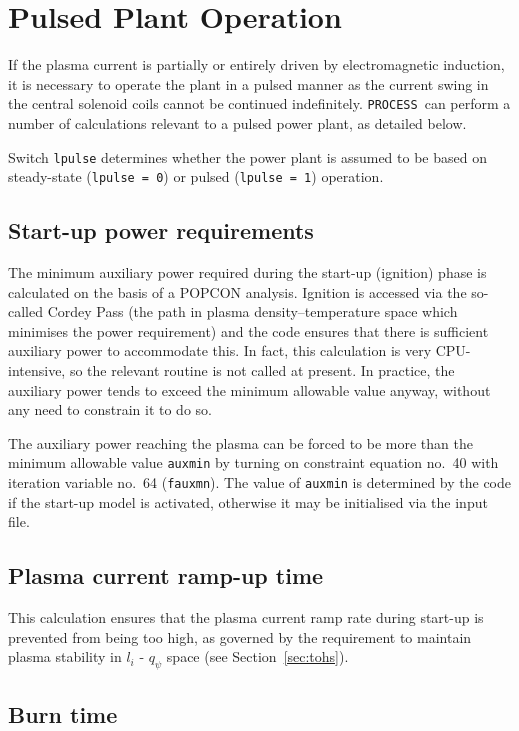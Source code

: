 \documentclass[11pt,a4paper]{report}
\newcommand{\process}{\mbox{\texttt{PROCESS}}}
\begin{document}
\section{Pulsed Plant Operation}
\label{sec:pulsed}

If the plasma current is partially or entirely driven by electromagnetic induction, it is
necessary to operate the plant in a pulsed manner as the current swing in the
central solenoid coils cannot be continued indefinitely. \process\ can perform a number of
calculations relevant to a pulsed power plant, as detailed below.

Switch \texttt{lpulse} determines whether the power plant is assumed to be
based on steady-state (\texttt{lpulse = 0}) or pulsed (\texttt{lpulse = 1})
operation.

\subsection{Start-up power requirements}

The minimum auxiliary power required during the start-up (ignition) phase is
calculated on the basis of a POPCON analysis. Ignition is accessed via the
so-called Cordey Pass (the path in plasma density--temperature space which
minimises the power requirement) and the code ensures that there is sufficient
auxiliary power to accommodate this. In fact, this calculation is very
CPU-intensive, so the relevant routine is not called at present. In practice,
the auxiliary power tends to exceed the minimum allowable value anyway,
without any need to constrain it to do so.

The auxiliary power reaching the plasma can be forced to be more than the
minimum allowable value \texttt{auxmin} by turning on constraint equation no.\
40 with iteration variable no.\ 64 (\texttt{fauxmn}). The value of
\texttt{auxmin} is determined by the code if the start-up model is activated,
otherwise it may be initialised via the input file.

\subsection{Plasma current ramp-up time}

This calculation ensures that the plasma current ramp rate during start-up is
prevented from being too high, as governed by the requirement to maintain
plasma stability in $l_i$ - $q_\psi$ space (see Section~\ref{sec:tohs}).

\subsection{Burn time}
\end{document}
